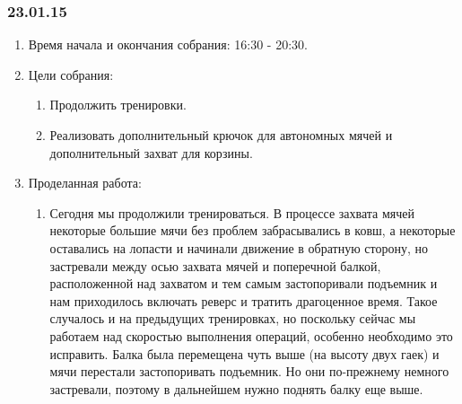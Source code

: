 \subsubsection{23.01.15}
\begin{enumerate}
	
	\item Время начала и окончания собрания: 16:30 - 20:30.
	
	\item Цели собрания: 
	\begin{enumerate}
		
		\item Продолжить тренировки.
		
		\item Реализовать дополнительный крючок для автономных мячей и дополнительный захват для корзины.
		
	\end{enumerate}

	\item Проделанная работа:
	\begin{enumerate}
		
		\item Сегодня мы продолжили тренироваться. В процессе захвата мячей некоторые большие мячи без проблем забрасывались в ковш, а некоторые оставались на лопасти и начинали движение в обратную сторону, но застревали между осью захвата мячей и поперечной балкой, расположенной над захватом и тем самым застопоривали подъемник и нам приходилось включать реверс и тратить драгоценное время. Такое случалось и на предыдущих тренировках, но поскольку сейчас мы работаем над скоростью выполнения операций, особенно необходимо это исправить. Балка была перемещена чуть выше (на высоту двух гаек) и мячи перестали застопоривать подъемник. Но они по-прежнему немного застревали, поэтому в дальнейшем нужно поднять балку еще выше.
		

\end{enumerate}
\end{enumerate}
